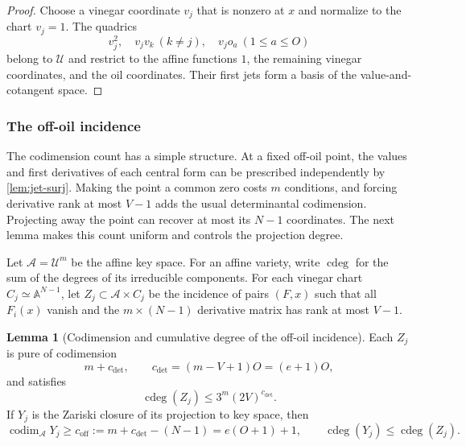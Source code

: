 \documentclass[11pt,a4paper]{article}
\theoremstyle{definition}
\newtheorem{lemma}[theorem]{Lemma}
\theoremstyle{remark}
\newcommand{\cU}{\mathcal U}
\newcommand{\codim}{\operatorname{codim}}
\newcommand{\cdeg}{\operatorname{cdeg}}
\newcommand{\off}{\mathrm{off}}
\begin{document}
\begin{proof}
Choose a vinegar coordinate $v_j$ that is nonzero at $x$ and normalize to the chart $v_j=1$.  The quadrics
\[
v_j^2,\quad v_jv_k\ (k\ne j),\quad v_jo_a\ (1\le a\le O)
\]
belong to $\cU$ and restrict to the affine functions $1$, the remaining vinegar coordinates, and the oil coordinates.  Their first jets form a basis of the value-and-cotangent space.
\end{proof}

\subsubsection{The off-oil incidence}

The codimension count has a simple structure.  At a fixed off-oil point, the values and first derivatives of each central form can be prescribed independently by \cref{lem:jet-surj}.  Making the point a common zero costs $m$ conditions, and forcing derivative rank at most $V-1$ adds the usual determinantal codimension.  Projecting away the point can recover at most its $N-1$ coordinates.  The next lemma makes this count uniform and controls the projection degree.

Let $\mathcal A=\cU^m$ be the affine key space.  For an affine variety, write $\cdeg$ for the sum of the degrees of its irreducible components.  For each vinegar chart $C_j\simeq\mathbb A^{N-1}$, let $Z_j\subset\mathcal A\times C_j$ be the incidence of pairs $(F,x)$ such that all $F_i(x)$ vanish and the $m\times(N-1)$ derivative matrix has rank at most $V-1$.

\begin{lemma}[Codimension and cumulative degree of the off-oil incidence]\label{lem:off-incidence}
Each $Z_j$ is pure of codimension
\[
m+c_{\det},\qquad c_{\det}=(m-V+1)O=(e+1)O,
\]
and satisfies
\[
\cdeg(Z_j)\le 3^m(2V)^{c_{\det}}.
\]
If $Y_j$ is the Zariski closure of its projection to key space, then
\[
\codim_{\mathcal A}Y_j\ge c_{\off}:=m+c_{\det}-(N-1)=e(O+1)+1,
\qquad
\cdeg(Y_j)\le\cdeg(Z_j).
\]
\end{lemma}
\end{document}
